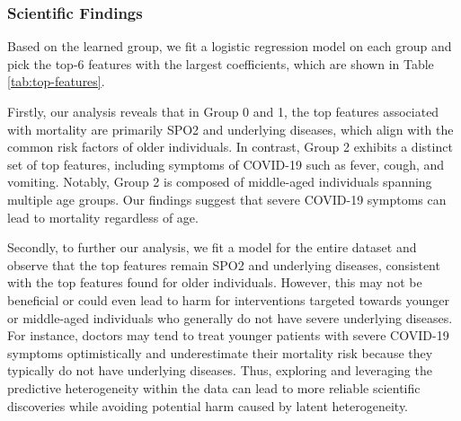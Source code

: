 \subsubsection{Scientific Findings}
Based on the learned group, we fit a logistic regression model on each group and pick the top-6 features with the largest coefficients, which are shown in Table \ref{tab:top-features}.

Firstly, our analysis reveals that in Group 0 and 1, the top features associated with mortality are primarily SPO2 and underlying diseases, which align with the common risk factors of older individuals. 
In contrast, Group 2 exhibits a distinct set of top features, including symptoms of COVID-19 such as fever, cough, and vomiting. 
Notably, Group 2 is composed of middle-aged individuals spanning multiple age groups. 
Our findings suggest that severe COVID-19 symptoms can lead to mortality regardless of age.

Secondly, to further our analysis, we fit a model for the entire dataset and observe that the top features remain SPO2 and underlying diseases, consistent with the top features found for older individuals. 
However, this may not be beneficial or could even lead to harm for interventions targeted towards younger or middle-aged individuals who generally do not have severe underlying diseases. 
For instance, doctors may tend to treat younger patients with severe COVID-19 symptoms optimistically and underestimate their mortality risk because they typically do not have underlying diseases.
Thus, exploring and leveraging the predictive heterogeneity within the data can lead to more reliable scientific discoveries while avoiding potential harm caused by latent heterogeneity.

